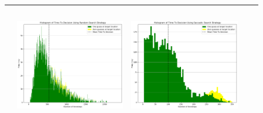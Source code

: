 \begin{landscape}
\begin{table}[h!]
\begin{tabular}{ | c | c | c | c | c |}
\begin{minipage}[c][58mm][c]{48mm}
    \end{minipage}
    &
    \begin{minipage}[c][58mm][c]{48mm}
      \includegraphics[width=48mm, height=52mm]{Chapters/MultiAgentTargetDetection/Figs/Histograms/VaryingInitBelief/75/75RandomHistogram.png}
    \end{minipage}
    &
    \begin{minipage}[c][58mm][c]{48mm}
      \includegraphics[width=48mm, height=52mm]{Chapters/MultiAgentTargetDetection/Figs/Histograms/VaryingInitBelief/75/75SaccadicHistogram.png}
    \end{minipage}
    \\
    \hline


\end{tabular}
\end{table}
\end{landscape}
